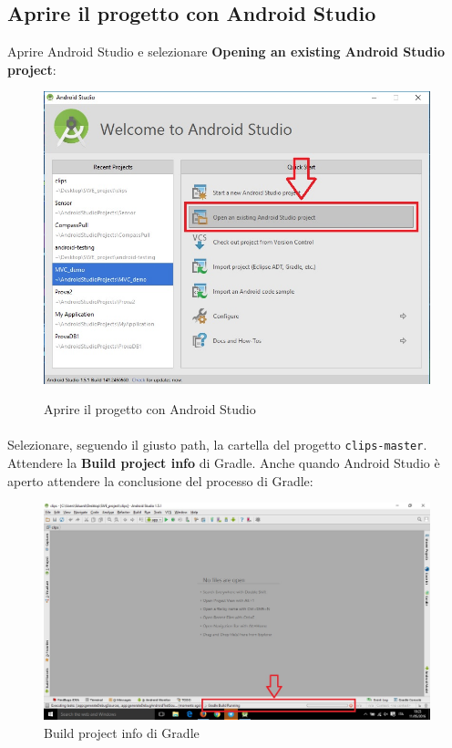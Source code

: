 \documentclass[../ManualeSviluppatore.tex]{subfiles}
\begin{document}
			
		
	\newpage	
	\subsection{Aprire il progetto con Android Studio}
		Aprire Android Studio e selezionare \textbf{Opening an existing Android Studio project}:
		
		\begin{figure} [h]
			\centering
			\includegraphics[scale=0.4]{img/AprireProgetto}
			\label{fig:AprireProgetto}
			\caption{Aprire il progetto con Android Studio}
		\end{figure}
		
		\paragraph*{}
			Selezionare, seguendo il giusto path, la cartella del progetto \verb|clips-master|. Attendere la \textbf{Build project info} di Gradle. Anche quando Android Studio è aperto attendere la conclusione del processo di Gradle:
			
		\begin{figure} [h]
			\centering
			\includegraphics[scale=0.34]{img/BuildGradle}
			\caption{Build project info di Gradle}
			\label{fig:BuildGradle}
		\end{figure}
		
\end{document}

